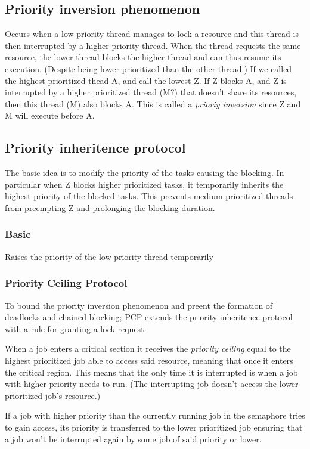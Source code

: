 \documentclass[a4paper]{article}
\begin{document}
\subsection{Priority inversion phenomenon}
Occurs when a low priority thread manages to lock a resource and this thread
is then interrupted by a higher priority thread. When the thread requests the
same resource, the lower thread blocks the higher thread and can thus resume
its execution. (Despite being lower prioritized than the other thread.)
If we called the highest prioritized thead A, and call the lowest Z. If Z
blocks A, and Z is interrupted by a higher prioritized thread (M?) that doesn't
share its resources, then this thread (M) also blocks A. This is called a 
\emph{prioriy inversion} since Z and M will execute before A.

\subsection{Priority inheritence protocol}
The basic idea is to modify the priority of the tasks causing the blocking. In
particular when Z blocks higher prioritized tasks, it temporarily inherits the
highest priority of the blocked tasks. This prevents medium prioritized threads
from preempting Z and prolonging the blocking duration.
\subsubsection{Basic}
Raises the priority of the low priority thread temporarily
\subsubsection{Priority Ceiling Protocol}
To bound the priority inversion phenomenon and preent the formation of deadlocks
and chained blocking; PCP extends the priority inheritence protocol with a
rule for granting a lock request.

When a job enters a critical section it receives the \emph{priority ceiling} 
equal to the highest prioritized job able to access said resource, meaning that
once it enters the critical region. This means that the only time it is
interrupted is when a job with higher priority needs to run. (The interrupting
job doesn't access the lower prioritized job's resource.)

If a job with higher priority than the currently running job in the semaphore
tries to gain access, its priority is transferred to the lower prioritized job
ensuring that a job won't be interrupted again by some job of said priority or
lower.
\end{document}
